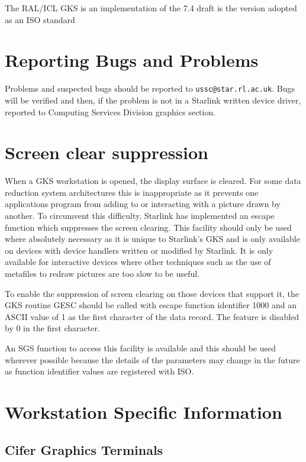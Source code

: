 \documentclass[11pt]{article}
\begin{document}
The RAL/ICL GKS is an implementation of the 7.4 draft
is the version adopted as an ISO standard

\section{Reporting Bugs and Problems}
Problems and suspected bugs should be reported to {\tt ussc@star.rl.ac.uk}.
Bugs will be verified and then, if the problem is not in a Starlink written
device driver, reported to Computing Services Division graphics section.

\section{Screen clear suppression}
When a GKS workstation is opened, the display surface is cleared.
For some data reduction system architectures this is inappropriate as it
prevents one applications program from adding to or interacting with a picture
drawn by another.
To circumvent this difficulty, Starlink has implemented an escape function which
suppresses the screen clearing.
This facility should only be used where absolutely necessary as it is unique to
Starlink's GKS and is only available on devices with device handlers written
or modified by Starlink.
It is only available for interactive devices where other techniques such as the
use of metafiles to redraw pictures are too slow to be useful.

To enable the suppression of screen clearing on those devices that support it,
the GKS routine GESC should be called with escape function identifier 1000 and
an ASCII value of 1 as the first character of the data record. The feature is
disabled by 0 in the first character.

An SGS function to access this facility is available and this should be used
wherever possible because the details of the parameters may change in the future
as function identifier values are registered with ISO.

\newpage\appendix
\section{Workstation Specific Information}\label{workstations}

\newcommand{\sect}[1]{{\bf #1}}

\subsection{Cifer Graphics Terminals}
\label{cifgt}
\end{document}
